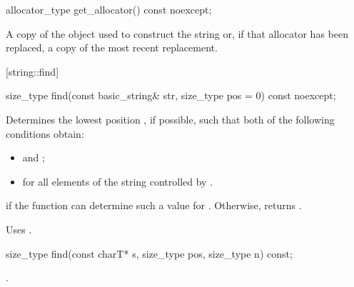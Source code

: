 %
%
\begin{itemdecl}
allocator_type get_allocator() const noexcept;
\end{itemdecl}

\begin{itemdescr}
\pnum
\returns
A copy of the
object used to construct the string or, if that allocator has been replaced, a
copy of the most recent replacement.
\end{itemdescr}

[string::find]{}

%
%
\begin{itemdecl}
size_type find(const basic_string& str,
               size_type pos = 0) const noexcept;
\end{itemdecl}

\begin{itemdescr}
\pnum
\effects
Determines the lowest position , if possible, such that both of
the following conditions obtain:

\begin{itemize}
\item
{} and
;
\item
{}%
for all elements  of the string controlled by .
\end{itemize}

\pnum
\returns
{} if the function can determine such a value for .
Otherwise, returns
.

\pnum
\notes
Uses
.
\end{itemdescr}

%
%
\begin{itemdecl}
size_type find(const charT* s, size_type pos, size_type n) const;
\end{itemdecl}

\begin{itemdescr}
\pnum
\returns
{}.
\end{itemdescr}

